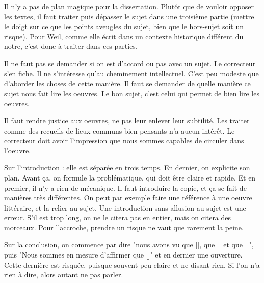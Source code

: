 \documentclass[a4paper,12pt]{book}
\begin{document}
\par Il n'y a pas de plan magique pour la dissertation. Plutôt que de vouloir opposer les textes, il faut traiter puis dépasser le sujet dans une troisième partie (mettre le doigt sur ce que les points aveugles du sujet, bien que le hors-sujet soit un risque). Pour Weil, comme elle écrit dans un contexte historique différent du notre, c'est donc à traiter dans ces parties.
\par Il ne faut pas se demander si on est d'accord ou pas avec un sujet. Le correcteur s'en fiche. Il ne s'intéresse qu'au cheminement intellectuel. C'est peu modeste que d'aborder les choses de cette manière. Il faut se demander de quelle manière ce sujet nous fait lire les oeuvres. Le bon sujet, c'est celui qui permet de bien lire les oeuvres.
\par Il faut rendre justice aux oeuvres, ne pas leur enlever leur subtilité. Les traiter comme des recueils de lieux communs bien-pensants n'a aucun intérêt. Le correcteur doit avoir l'impression que nous sommes capables de circuler dans l'oeuvre.
\par Sur l'introduction : elle est séparée en trois temps. En dernier, on explicite son plan. Avant ça, on formule la problématique, qui doit être claire et rapide. Et en premier, il n'y a rien de mécanique. Il faut introduire la copie, et ça se fait de manières très différentes. On peut par exemple faire une référence à une oeuvre littéraire, et la relier au sujet. Une introduction sans allusion au sujet est une erreur. S'il est trop long, on ne le citera pas en entier, mais on citera des morceaux. Pour l'accroche, prendre un risque ne vaut que rarement la peine.
\par Sur la conclusion, on commence par dire "nous avons vu que [], que [] et que []", puis "Nous sommes en mesure d'affirmer que []" et en dernier une ouverture. Cette dernière est risquée, puisque souvent peu claire et ne disant rien. Si l'on n'a rien à dire, alors autant ne pas parler.
\end{document}
